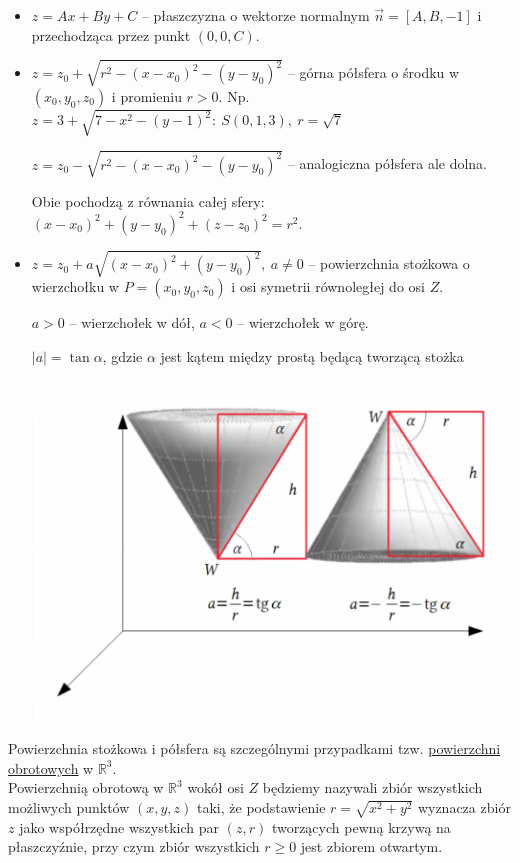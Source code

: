 \begin{itemize}
    \item $ z = Ax + By + C $ -- płaszczyzna o wektorze normalnym $ \vec{n} = [A, B, -1] $ i przechodząca przez punkt $ (0,0,C) $.
    \item $ z = z_0 + \sqrt{r^2 - (x-x_0)^2 - (y-y_0)^2} $ -- górna półsfera o środku w $(x_0, y_0, z_0)$ i promieniu $r > 0$. Np.
    $ z = 3 + \sqrt{7 - x^2 - (y-1)^2} : \ S(0,1,3), \ r=\sqrt{7} $

    $ z = z_0 - \sqrt{r^2 - (x-x_0)^2 - (y-y_0)^2} $ -- analogiczna półsfera ale dolna.

    Obie pochodzą z równania całej sfery: $ (x - x_0)^2 + (y - y_0)^2 + (z - z_0)^2 = r^2 $.
    \item $ z = z_0 + a\sqrt{(x-x_0)^2 + (y-y_0)^2}, \ a \neq 0 $ -- powierzchnia stożkowa o wierzchołku w $ P = (x_0,y_0,z_0) $
    i osi symetrii równoległej do osi $Z$.

    $a > 0$ -- wierzchołek w dół, $a < 0$ -- wierzchołek w górę.

    $|a| = \tan \alpha $, gdzie $\alpha$ jest kątem między prostą będącą tworzącą stożka

    \includegraphics[scale=0.5]{img/stozek_wlzm.png}
\end{itemize}

Powierzchnia stożkowa i półsfera są szczególnymi przypadkami tzw. \underline{powierzchni obrotowych} w $\mathbb{R}^3$. \\

Powierzchnią obrotową w $\mathbb{R}^3$ wokół osi $Z$ będziemy nazywali zbiór wszystkich możliwych punktów
$(x,y,z)$ taki, że podstawienie $r = \sqrt{x^2 + y^2}$ wyznacza zbiór $z$ jako współrzędne wszystkich par $(z,r)$
tworzących pewną krzywą na płaszczyźnie, przy czym zbiór wszystkich $r \geq 0$ jest zbiorem otwartym.


